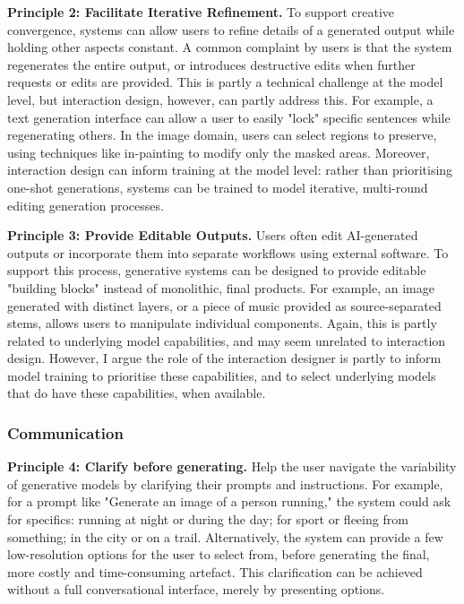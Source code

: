 \textbf{Principle 2: Facilitate Iterative Refinement.} To support creative convergence, systems can allow users to refine details of a generated output while holding other aspects constant. A common complaint by users is that the system regenerates the entire output, or introduces destructive edits when further requests or edits are provided. This is partly a technical challenge at the model level, but interaction design, however, can partly address this. For example, a text generation interface can allow a user to easily "lock" specific sentences while regenerating others. In the image domain, users can select regions to preserve, using techniques like in-painting to modify only the masked areas. Moreover, interaction design can inform training at the model level: rather than prioritising one-shot generations, systems can be trained to model iterative, multi-round editing generation processes. 

\textbf{Principle 3: Provide Editable Outputs.} Users often edit AI-generated outputs or incorporate them into separate workflows using external software. To support this process, generative systems can be designed to provide editable "building blocks" instead of monolithic, final products. For example, an image generated with distinct layers, or a piece of music provided as source-separated stems, allows users to manipulate individual components. Again, this is partly related to underlying model capabilities, and may seem unrelated to interaction design. However, I argue the role of the interaction designer is partly to inform model training to prioritise these capabilities, and to select underlying models that do have these capabilities, when available. 

\subsubsection{Communication}

\textbf{Principle 4: Clarify before generating.} Help the user navigate the variability of generative models by clarifying their prompts and instructions. For example, for a prompt like "Generate an image of a person running," the system could ask for specifics: running at night or during the day; for sport or fleeing from something; in the city or on a trail. Alternatively, the system can provide a few low-resolution options for the user to select from, before generating the final, more costly and time-consuming artefact. This clarification can be achieved without a full conversational interface, merely by presenting options.

